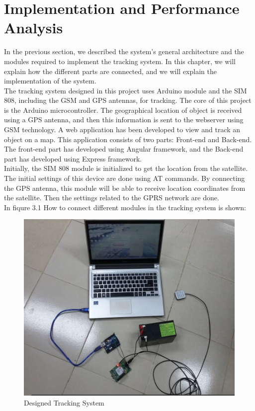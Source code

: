 \chapter{Implementation and Performance Analysis}
In the previous section, we described the system's general architecture and the modules required to implement the tracking system. In this chapter, we will explain how the different parts are connected, and we will explain the implementation of the system.\\
The tracking system designed in this project uses Arduino module and the ُSIM 808, including the GSM and GPS antennas, for tracking. The core of this project is the Arduino microcontroller. The geographical location of object is received using a GPS antenna, and then this information is sent to the webserver using GSM technology. A web application has been developed to view and track an object on a map. This application consists of two parts: Front-end and Back-end. The front-end part has developed using Angular framework, and the Back-end part has developed using Express framework.\\
Initially, the SIM 808 module is initialized to get the location from the satellite. The initial settings of this device are done using AT commands. By connecting the GPS antenna, this module will be able to receive location coordinates from the satellite. Then the settings related to the GPRS network are done.\\
In fiqure 3.1 How to connect different modules in the tracking system is shown:\\
\begin{figure}[!h]
	\centerline{\includegraphics[width=.7\textwidth]{design-system}}
	\caption{Designed Tracking System}
\end{figure}\\

